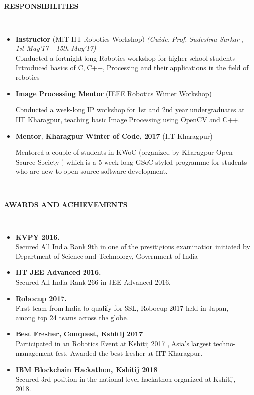 \documentclass[a4paper,8pt]{article}
\newcommand{\lsep}{-0.5cm}
\newcommand{\resheading}[1]{{\small \colorbox{mygrey}{\begin{minipage}{0.975\textwidth}{\textbf{#1 \vphantom{p\^{E}}}}\end{minipage}}}}
\begin{document}
\hspace{0.5cm}\\[-0.2cm]
\resheading{\textbf{ RESPONSIBILITIES } }\\[\lsep]
\begin{itemize}
\item \textbf{Instructor} (MIT-IIT Robotics Workshop) \hfill \textit{(Guide: Prof. Sudeshna Sarkar
, 1st May'17 - 15th May'17)} \\
\small{Conducted a fortnight long Robotics workshop for higher school students
Introduced basics of C, C++, Processing and their applications in the field of robotics} 

\item \textbf{Image Processing Mentor} (IEEE Robotics Winter Workshop) \hspace{0.5cm}\

\small{Conducted a week-long IP workshop for 1st and 2nd year undergraduates at IIT Kharagpur, teaching basic Image Processing using OpenCV and C++.} 

\item \textbf{Mentor, Kharagpur Winter of Code, 2017} (IIT Kharagpur) \hspace{0.5cm}\

\small{Mentored a couple of students in KWoC (organized by Kharagpur Open Source Society
) which is a 5-week long GSoC-styled programme for students who are new to open source software development. } 

\end{itemize}

\hspace{0.5cm}\\[-0.2cm]
\resheading{\textbf{AWARDS AND ACHIEVEMENTS} }\\[\lsep]
\begin{itemize}
\item \noindent \textbf{KVPY 2016.} \\
Secured All India Rank 9th in one of the presitigious examination initiated by Department of Science and Technology, Government of India

\item \noindent \textbf{IIT JEE Advanced 2016.} \\
Secured All India Rank 266 in JEE Advanced 2016.

\item \noindent \textbf{Robocup 2017.} \\
First team from India to qualify for SSL, Robocup 2017 held in Japan, among top 24 teams across the globe.

\item \noindent \textbf{Best Fresher, Conquest, Kshitij 2017} \\
Participated in an Robotics Event at Kshitij 2017 , Asia’s largest techno-management fest. Awarded the best fresher at IIT Kharagpur.

\item \noindent \textbf{IBM Blockchain Hackathon, Kshitij 2018} \\
Secured 3rd position in the national level hackathon organized at Kshitij, 2018.

\end{itemize}
\end{document}
